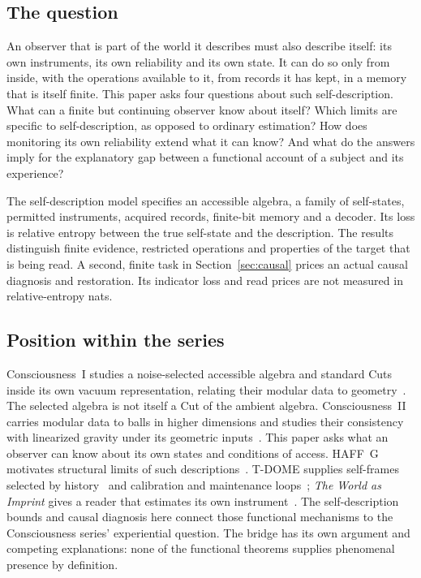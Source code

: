 \documentclass[12pt]{article}
\theoremstyle{definition}
\theoremstyle{remark}
\begin{document}
\subsection{The question}

An observer that is part of the world it describes must also describe itself: its own instruments, its own reliability and its own state. It can do so only from inside, with the operations available to it, from records it has kept, in a memory that is itself finite. This paper asks four questions about such self-description. What can a finite but continuing observer know about itself? Which limits are specific to self-description, as opposed to ordinary estimation? How does monitoring its own reliability extend what it can know? And what do the answers imply for the explanatory gap between a functional account of a subject and its experience?

The self-description model specifies an accessible algebra, a family of
self-states, permitted instruments, acquired records, finite-bit memory
and a decoder. Its loss is relative entropy between the true self-state
and the description. The results distinguish finite evidence, restricted
operations and properties of the target that is being read. A second,
finite task in Section~\ref{sec:causal} prices an actual causal diagnosis
and restoration. Its indicator loss and read prices are not measured
in relative-entropy nats.

\subsection{Position within the series}

Consciousness~I studies a noise-selected accessible algebra and standard
Cuts inside its own vacuum representation, relating their modular
data to geometry~\cite{PaperI}. The selected algebra is not itself a
Cut of the ambient algebra. Consciousness~II carries modular data to
balls in higher dimensions and studies their consistency with linearized
gravity under its geometric inputs~\cite{PaperII}. This paper asks what
an observer can know about its own states and conditions of access.
HAFF~G motivates structural limits of such descriptions~\cite{PaperG}.
T-DOME supplies self-frames selected by history~\cite{TDOMEII} and
calibration and maintenance loops~\cite{TDOMEIII}; \emph{The World as
Imprint} gives a reader that estimates its own instrument~\cite{WorldImprint}.
The self-description bounds and causal diagnosis here connect those
functional mechanisms to the Consciousness series' experiential question.
The bridge has its own argument and competing explanations: none of the
functional theorems supplies phenomenal presence by definition.
\end{document}

